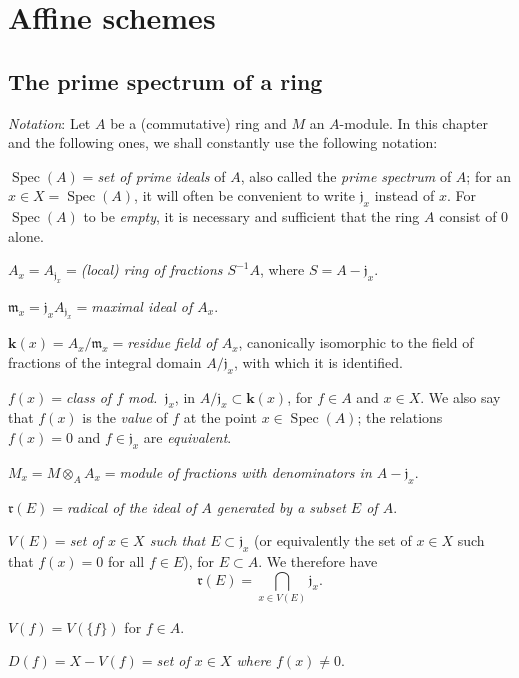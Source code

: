 \section{Affine schemes}
\label{section:I.1}

\setcounter{subsection}{0}
\subsection{The prime spectrum of a ring}
\label{subsection:I.1.1}

\begin{env}[1.1.1]
\label{I.1.1.1}
\emph{Notation}: Let $A$ be a (commutative) ring and $M$ an $A$-module. In
this chapter and the following ones, we shall constantly use the following
notation:

\smallskip
\noindent
$\operatorname{Spec}(A)={}$\emph{set of prime ideals} of $A$, also called
the \emph{prime spectrum} of $A$; for an
$x\in X=\operatorname{Spec}(A)$, it will often be convenient to write
$\mathfrak{j}_x$ instead of $x$. For $\operatorname{Spec}(A)$ to be
\emph{empty}, it is necessary and sufficient that the ring $A$ consist of
$0$ alone.

\smallskip
\noindent
$A_x=A_{\mathfrak{j}_x}={}$\emph{(local) ring of fractions $S^{-1}A$}, where
$S=A-\mathfrak{j}_x$.

\smallskip
\noindent
$\mathfrak{m}_x=\mathfrak{j}_xA_{\mathfrak{j}_x}={}$\emph{maximal ideal of
$A_x$}.

\smallskip
\noindent
$\boldsymbol{k}(x)=A_x/\mathfrak{m}_x={}$\emph{residue field of $A_x$}, canonically
isomorphic to the field of fractions of the integral domain
$A/\mathfrak{j}_x$, with which it is identified.

\smallskip
\noindent
$f(x)={}$\emph{class of $f$ mod.~$\mathfrak{j}_x$}, in
$A/\mathfrak{j}_x\subset\boldsymbol{k}(x)$, for $f\in A$ and $x\in X$. We also say that
$f(x)$ is the \emph{value} of $f$ at the point $x\in\operatorname{Spec}(A)$;
the relations $f(x)=0$ and $f\in\mathfrak{j}_x$ are \emph{equivalent}.

\smallskip
\noindent
$M_x=M\otimes_AA_x={}$\emph{module of fractions with denominators in
$A-\mathfrak{j}_x$}.

\smallskip
\noindent
$\mathfrak{r}(E)={}$\emph{radical of the ideal of $A$ generated by a subset
$E$ of $A$}.

\smallskip
\noindent
$V(E)={}$\emph{set of $x\in X$ such that $E\subset\mathfrak{j}_x$}
(or equivalently the set of $x\in X$ such that $f(x)=0$ for all $f\in E$),
for $E\subset A$. We therefore have
\begin{equation}
  \mathfrak{r}(E)=\bigcap_{x\in V(E)}\mathfrak{j}_x.
  \tag{1.1.1.1}\label{I.1.1.1.1}
\end{equation}

\smallskip
\noindent
$V(f)=V(\{f\})$ for $f\in A$.

\smallskip
\noindent
$D(f)=X-V(f)={}$\emph{set of $x\in X$ where $f(x)\neq0$}.
\end{env}

